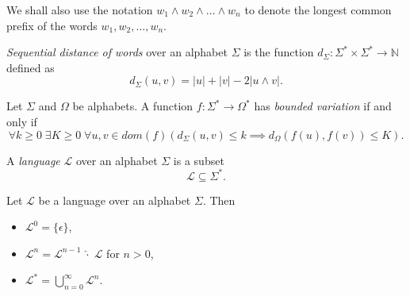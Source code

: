 We shall also use the notation $w_1 \wedge w_2 \wedge \ldots \wedge w_n$ to denote
the longest common prefix of the words $w_1, w_2, \ldots, w_n$.

\begin{definition}
  \emph{Sequential distance of words} over an alphabet $\Sigma$ is the function
  $d_\Sigma : \Sigma^* \times \Sigma^* \rightarrow \mathbb{N}$ defined as
  \begin{equation*}
    d_\Sigma(u, v) = |u| + |v| - 2|u \wedge v|.
  \end{equation*}
\end{definition}

\begin{definition}
  Let $\Sigma$ and $\Omega$ be alphabets. A function $f : \Sigma^* \rightarrow
  \Omega^*$ has \emph{bounded variation} if and only if
  \begin{equation*}
    \forall k \geq 0 \; \exists K \geq 0 \; \forall u, v \in dom(f) (d_\Sigma(u, v)
    \leq k \implies d_\Omega(f(u), f(v)) \leq K).
  \end{equation*}
\end{definition}

\begin{definition}
  A \emph{language} $\mathcal{L}$ over an alphabet $\Sigma$ is a subset
  \begin{equation*}
    \mathcal{L} \subseteq \Sigma^*.
  \end{equation*}
\end{definition}

\begin{definition}
  Let $\mathcal{L}$ be a language over an alphabet $\Sigma$. Then
  \begin{itemize}
    \item $\mathcal{L}^0 = \{ \epsilon \}$,
    \item $\mathcal{L}^n = \mathcal{L}^{n-1}\;\hat{\cdot}\;\mathcal{L}$ for $n > 0$,
    \item $\mathcal{L}^* = \bigcup_{n = 0}^{\infty} \mathcal{L}^n$.
  \end{itemize}
\end{definition}
